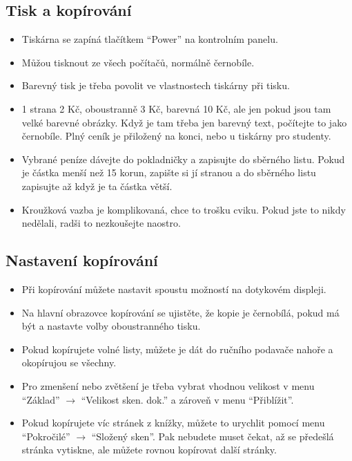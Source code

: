 \documentclass{article}
\begin{document}
\subsection{Tisk a kopírování}
\begin{itemize}
\item Tiskárna se zapíná tlačítkem \enquote{Power} na kontrolním panelu.
\item Můžou tisknout ze všech počítačů, normálně černobíle.
\item Barevný tisk je třeba povolit ve vlastnostech tiskárny při tisku.
\item 1 strana 2 Kč, oboustranně 3 Kč, barevná 10 Kč, ale jen pokud jsou tam velké barevné obrázky. Když je tam třeba jen barevný text, počítejte to jako černobíle. Plný ceník je přiložený na konci, nebo u tiskárny pro studenty.
\item Vybrané peníze dávejte do pokladničky a zapisujte do sběrného listu. Pokud je částka menší než 15 korun, zapište si jí stranou a do sběrného listu zapisujte až když je ta částka větší.
\item Kroužková vazba je komplikovaná, chce to trošku cviku. Pokud jste to nikdy nedělali, radši to nezkoušejte naostro.
\end{itemize}
  
\subsection{Nastavení kopírování}
\begin{itemize}
\item Při kopírování můžete nastavit spoustu možností na dotykovém displeji.
\item Na hlavní obrazovce kopírování se ujistěte, že kopie je černobílá, pokud má být a nastavte volby oboustranného tisku. 
\item Pokud kopírujete volné listy, můžete je dát do ručního podavače nahoře a okopírujou se všechny. 
\item Pro zmenšení nebo zvětšení je třeba vybrat vhodnou velikost v menu \enquote{Základ} $\rightarrow$ \enquote{Velikost sken. dok.} a zároveň v menu \enquote{Přiblížit}.
\item Pokud kopírujete víc stránek z knížky, můžete to urychlit pomocí menu \enquote{Pokročilé} $\rightarrow$ \enquote{Složený sken}. Pak nebudete muset čekat, až se předešlá stránka vytiskne, ale můžete rovnou kopírovat další stránky. 
\end{itemize}
\end{document}
